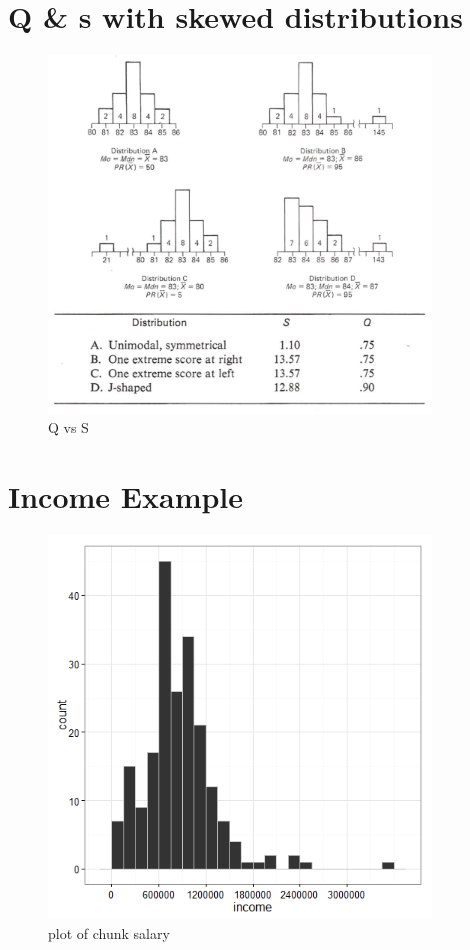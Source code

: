 \documentclass[12pt]{article}
\begin{document}
\section{Q \& s with skewed
distributions}\label{q-s-with-skewed-distributions}

\begin{figure}[H]
\centering
\includegraphics[width=4in]{skew_sd.png}
\caption{Q vs S}
\end{figure}

\section{Income Example}\label{football-coaches-salary}

\begin{figure}[H]
\centering
\includegraphics[width=4in]{figure/salary-1.png}
\caption{plot of chunk salary}
\end{figure}
\end{document}
